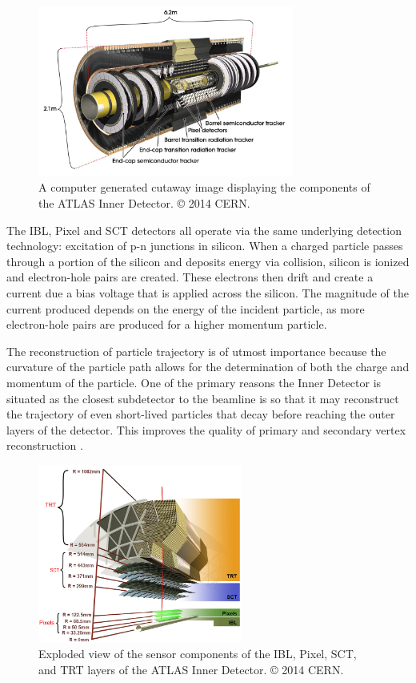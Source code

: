 \begin{figure}
	\centering
	\includegraphics[width=0.75\textwidth]{inner_detector}
	\caption{A computer generated cutaway image displaying the components of the ATLAS Inner Detector. © 2014 CERN.}
	\label{fig:inner_detector_cgi}
\end{figure}

The IBL, Pixel and SCT detectors all operate via the same underlying detection technology: excitation of p-n junctions in silicon.
When a charged particle passes through a portion of the silicon and deposits energy via collision, silicon is ionized and electron-hole pairs are created.
These electrons then drift and create a current due a bias voltage that is applied across the silicon.
The magnitude of the current produced depends on the energy of the incident particle, as more electron-hole pairs are produced for a higher momentum particle.

The reconstruction of particle trajectory is of utmost importance because the curvature of the particle path allows for the determination of both the charge and momentum of the particle.
One of the primary reasons the Inner Detector is situated as the closest subdetector to the beamline is so that it may reconstruct the trajectory of even short-lived particles that decay before reaching the outer layers of the detector.
This improves the quality of primary and secondary vertex reconstruction .

\begin{figure}
	\centering
	\includegraphics[width=0.6\textwidth]{inner_detector_zoomed}
	\caption{Exploded view of the sensor components of the IBL, Pixel, SCT, and TRT layers of the ATLAS Inner Detector. © 2014 CERN.}
	\label{fig:inner_detector_zoomed_cgi}
\end{figure}

